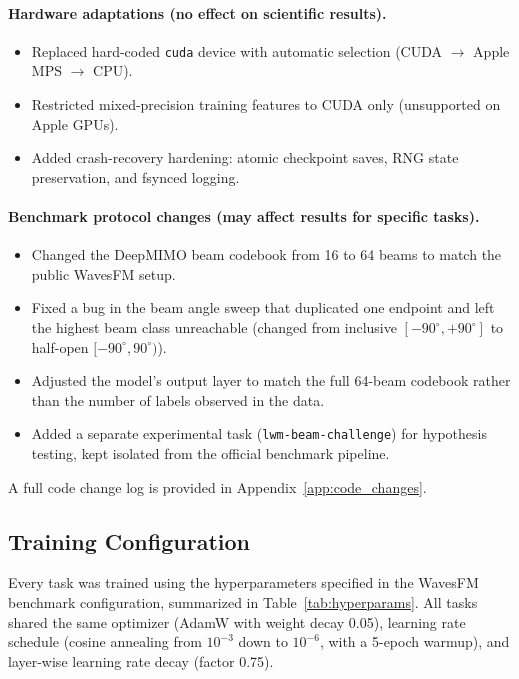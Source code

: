 \documentclass[11pt]{article}
\newcommand{\code}[1]{\texttt{#1}}
\begin{document}
\paragraph{Hardware adaptations (no effect on scientific results).}
\begin{itemize}
    \item Replaced hard-coded \code{cuda} device with automatic selection (CUDA $\rightarrow$ Apple MPS $\rightarrow$ CPU).
    \item Restricted mixed-precision training features to CUDA only (unsupported on Apple GPUs).
    \item Added crash-recovery hardening: atomic checkpoint saves, RNG state preservation, and fsynced logging.
\end{itemize}

\paragraph{Benchmark protocol changes (may affect results for specific tasks).}
\begin{itemize}
    \item Changed the DeepMIMO beam codebook from 16 to 64 beams to match the public WavesFM setup.
    \item Fixed a bug in the beam angle sweep that duplicated one endpoint and left the highest beam class unreachable (changed from inclusive $[-90^{\circ}, +90^{\circ}]$ to half-open $[-90^{\circ}, 90^{\circ})$).
    \item Adjusted the model's output layer to match the full 64-beam codebook rather than the number of labels observed in the data.
    \item Added a separate experimental task (\code{lwm-beam-challenge}) for hypothesis testing, kept isolated from the official benchmark pipeline.
\end{itemize}

A full code change log is provided in Appendix~\ref{app:code_changes}.

\subsection{Training Configuration}

Every task was trained using the hyperparameters specified in the WavesFM benchmark configuration, summarized in Table~\ref{tab:hyperparams}. All tasks shared the same optimizer (AdamW with weight decay 0.05), learning rate schedule (cosine annealing from $10^{-3}$ down to $10^{-6}$, with a 5-epoch warmup), and layer-wise learning rate decay (factor 0.75).
\end{document}
